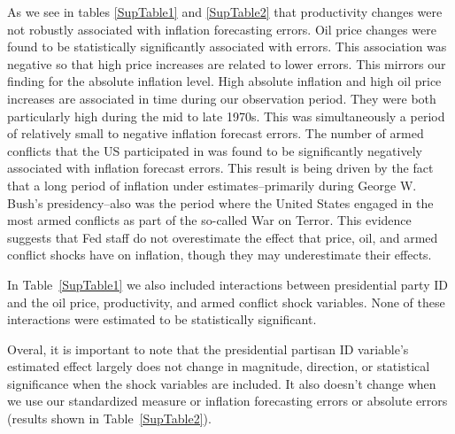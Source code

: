 \documentclass[a4paper]{article}\usepackage[]{graphicx}\usepackage[]{color}
\begin{document}
As we see in tables \ref{SupTable1} and \ref{SupTable2} that productivity changes were not robustly associated with inflation forecasting errors. Oil price changes were found to be statistically significantly associated with errors. This association was negative so that high price increases are related to lower errors. This mirrors our finding for the absolute inflation level. High absolute inflation and high oil price increases are associated in time during our observation period. They were both particularly high during the mid to late 1970s. This was simultaneously a period of relatively small to negative inflation forecast errors. The number of armed conflicts that the US participated in was found to be significantly negatively associated with inflation forecast errors. This result is being driven by the fact that a long period of inflation under estimates--primarily during George W. Bush's presidency--also was the period where the United States engaged in the most armed conflicts as part of the so-called War on Terror. This evidence suggests that Fed staff do not overestimate the effect that price, oil, and armed conflict shocks have on inflation, though they may underestimate their effects.

In Table~\ref{SupTable1} we also included interactions between presidential party ID and the oil price, productivity, and armed conflict shock variables. None of these interactions were estimated to be statistically significant. 

Overal, it is important to note that the presidential partisan ID variable's estimated effect largely does not change in magnitude, direction, or statistical significance when the shock variables are included. It also doesn't change when we use our standardized measure or inflation forecasting errors or absolute errors (results shown in Table~\ref{SupTable2}).
\end{document}
